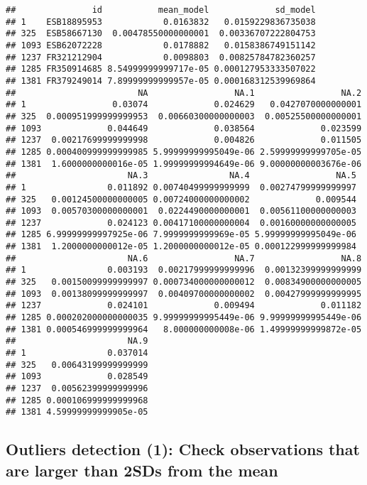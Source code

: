 \documentclass[]{article}
\begin{document}
\begin{verbatim}
##               id           mean_model             sd_model
## 1    ESB18895953            0.0163832   0.0159229836735038
## 325  ESB58667130  0.00478550000000001  0.00336707222804753
## 1093 ESB62072228            0.0178882   0.0158386749151142
## 1237 FR321212904            0.0098803  0.00825784782360257
## 1285 FR350914685 8.54999999999717e-05 0.000127953333507022
## 1381 FR379249014 7.89999999999957e-05 0.000168312539969864
##                        NA                 NA.1                 NA.2
## 1                 0.03074             0.024629   0.0427070000000001
## 325  0.000951999999999953  0.00660300000000003  0.00525500000000001
## 1093             0.044649             0.038564             0.023599
## 1237  0.00217699999999998             0.004826             0.011505
## 1285 0.000400999999999985 5.99999999995049e-06 2.59999999999705e-05
## 1381  1.6000000000016e-05 1.99999999994649e-06 9.00000000003676e-06
##                      NA.3                NA.4                 NA.5
## 1                0.011892 0.00740499999999999  0.00274799999999997
## 325   0.00124500000000005 0.00724000000000002             0.009544
## 1093  0.00570300000000001  0.0224490000000001  0.00561100000000003
## 1237             0.024123 0.00417100000000004  0.00160000000000005
## 1285 6.99999999997925e-06 7.9999999999969e-05 5.99999999995049e-06
## 1381  1.2000000000012e-05 1.2000000000012e-05 0.000122999999999984
##                      NA.6                 NA.7                 NA.8
## 1                0.003193  0.00217999999999996  0.00132399999999999
## 325   0.00150099999999997 0.000734000000000012  0.00834900000000005
## 1093  0.00138099999999997  0.00409700000000002  0.00427999999999995
## 1237             0.024101             0.009494             0.011182
## 1285 0.000202000000000035 9.99999999995449e-06 9.99999999995449e-06
## 1381 0.000546999999999964   8.000000000008e-06 1.49999999999872e-05
##                      NA.9
## 1                0.037014
## 325   0.00643199999999999
## 1093             0.028549
## 1237  0.00562399999999996
## 1285 0.000106999999999968
## 1381 4.59999999999905e-05
\end{verbatim}

\hypertarget{outliers-detection-1-check-observations-that-are-larger-than-2sds-from-the-mean}{%
\subsection{Outliers detection (1): Check observations that are larger
than 2SDs from the
mean}\label{outliers-detection-1-check-observations-that-are-larger-than-2sds-from-the-mean}}
\end{document}
